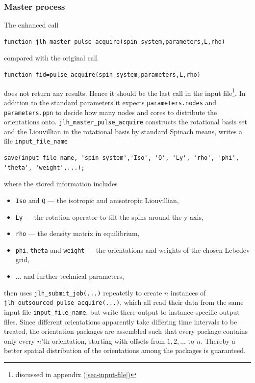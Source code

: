 \documentclass[11.5pt,a4paper]{article}
\begin{document}
\subsubsection{Master process}
The enhanced call
\begin{lstlisting}
function jlh_master_pulse_acquire(spin_system,parameters,L,rho)
\end{lstlisting}
compared with the original call
\begin{lstlisting}
function fid=pulse_acquire(spin_system,parameters,L,rho)
\end{lstlisting}
does not return any results. Hence it should be the last call in the input file\footnote{discussed in appendix (\ref{sec-input-file})}. In addition to the standard parameters it expects \verb$parameters.nodes$ and \verb$parameters.ppn$ to decide how many nodes and cores to distribute the orientations onto. \verb$jlh_master_pulse_acquire$ constructs the rotational basis set and the Liouvillian in the rotational basis by standard Spinach means, writes a file \verb$input_file_name$ 
\begin{lstlisting}
save(input_file_name, 'spin_system','Iso', 'Q', 'Ly', 'rho', 'phi', 'theta', 'weight',...);
\end{lstlisting}
where the stored information includes
\begin{itemize}
 \item \verb$Iso$ and \verb$Q$ --- the isotropic and anisotropic Liouvillian,
  \item \verb$Ly$ --- the rotation operator to tilt the spins around the y-axis,
  \item \verb$rho$ --- the density matrix in equilibrium,
  \item \verb$phi$, \verb$theta$ and \verb$weight$ --- the orientations and weights of the chosen Lebedev grid,
  \item ... and further technical parameters,
\end{itemize}
then uses \verb$jlh_submit_job(...)$ repeatetly to create $n$ instances of \texttt{jlh\_outsourced\_pulse\_acquire(...)}, which all read their data from the same input file \verb$input_file_name$, but write there output to instance-specific output files. Since different orientations apparently take differing time intervals to be treated, the orientation packages are assembled such that every package contains only every $n$'th orientation, starting with offsets from $1,2,...$ to $n$. Thereby a better spatial distribution of the orientations among the packages is guaranteed.
\end{document}
